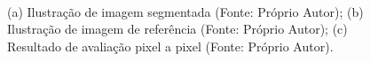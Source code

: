 \begin{figure}[!h]
    \centering
    \\
    \caption{(a) Ilustra\c{c}\~{a}o de imagem segmentada (Fonte: Pr\'{o}prio Autor); (b) Ilustra\c{c}\~{a}o de imagem de refer\^{e}ncia (Fonte: Pr\'{o}prio Autor); (c) Resultado de avalia\c{c}\~{a}o pixel a pixel (Fonte: Pr\'{o}prio Autor).}
    \label{Fig:exemples}
\end{figure}

